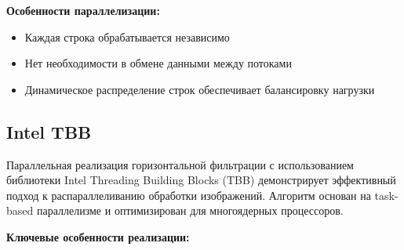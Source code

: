 \documentclass[12pt]{article}
\begin{document}
\textbf{Особенности параллелизации:}
\begin{itemize}
\item Каждая строка обрабатывается независимо
\item Нет необходимости в обмене данными между потоками
\item Динамическое распределение строк обеспечивает балансировку нагрузки
\end{itemize}


\subsection{Intel TBB}

\hspace*{1.25em}Параллельная реализация горизонтальной фильтрации с использованием библиотеки Intel Threading Building Blocks (TBB) демонстрирует эффективный подход к распараллеливанию обработки изображений. Алгоритм основан на task-based параллелизме и оптимизирован для многоядерных процессоров.

\textbf{Ключевые особенности реализации:}
\end{document}
